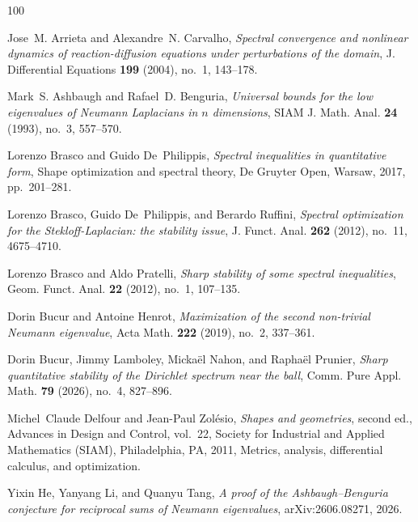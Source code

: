 \documentclass{amsart}
\numberwithin{equation}{section}
\theoremstyle{plain}
\theoremstyle{definition}
\theoremstyle{plain}
\theoremstyle{remark}
\numberwithin{figure}{section}
\begin{document}
\providecommand{\bysame}{\leavevmode\hbox to3em{\hrulefill}\thinspace}
\providecommand{\MR}{\relax\ifhmode\unskip\space\fi MR }
\providecommand{\MRhref}[2]{%
  \href{http://www.ams.org/mathscinet-getitem?mr=#1}{#2}
}
\providecommand{\href}[2]{#2}
\begin{thebibliography}{100}

{J}ose~{M}. {A}rrieta and {A}lexandre~{N}. {C}arvalho, \emph{{S}pectral
  convergence and nonlinear dynamics of reaction-diffusion equations under
  perturbations of the domain}, J. Differential Equations \textbf{199} (2004),
  no.~1, 143--178. 

Mark~S. Ashbaugh and Rafael~D. Benguria, \emph{{U}niversal bounds for the low
  eigenvalues of {N}eumann {L}aplacians in {$n$} dimensions}, SIAM J. Math.
  Anal. \textbf{24} (1993), no.~3, 557--570. 

Lorenzo Brasco and Guido De~Philippis, \emph{{S}pectral inequalities in
  quantitative form}, {S}hape optimization and spectral theory, De Gruyter
  Open, Warsaw, 2017, pp.~201--281. 

Lorenzo Brasco, Guido De~Philippis, and Berardo Ruffini, \emph{{S}pectral
  optimization for the {S}tekloff-{L}aplacian: the stability issue}, J. Funct.
  Anal. \textbf{262} (2012), no.~11, 4675--4710. 

Lorenzo Brasco and Aldo Pratelli, \emph{{S}harp stability of some spectral
  inequalities}, Geom. Funct. Anal. \textbf{22} (2012), no.~1, 107--135. 

Dorin Bucur and Antoine Henrot, \emph{{M}aximization of the second non-trivial
  {N}eumann eigenvalue}, Acta Math. \textbf{222} (2019), no.~2, 337--361. 

Dorin Bucur, Jimmy Lamboley, Micka\"el Nahon, and Rapha\"el Prunier,
  \emph{{S}harp quantitative stability of the {D}irichlet spectrum near the
  ball}, Comm. Pure Appl. Math. \textbf{79} (2026), no.~4, 827--896. 

Michel~Claude Delfour and Jean-Paul Zol\'esio, \emph{{S}hapes and geometries},
  second ed., Advances in Design and Control, vol.~22, Society for Industrial
  and Applied Mathematics (SIAM), Philadelphia, PA, 2011, Metrics, analysis,
  differential calculus, and optimization. 

Yixin He, Yanyang Li, and Quanyu Tang, \emph{{A} proof of the
  {A}shbaugh--{B}enguria conjecture for reciprocal sums of {N}eumann
  eigenvalues}, \href{https://arxiv.org/abs/2606.08271}{arXiv:2606.08271},
  2026.


\end{thebibliography}
\end{document}
